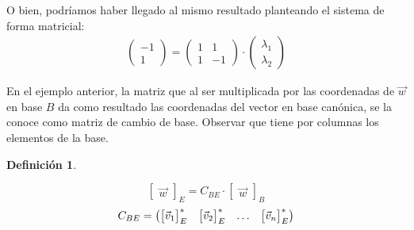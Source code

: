 \documentclass[a5paper,12pt,twoside]{book}
\newtheorem{defn}{{Definición}}[chapter]
\begin{document}
\begin{mdframed}[style=ExampleFrame]
    O bien, podríamos haber llegado al mismo resultado planteando el sistema de forma matricial:
    \begin{gather*}
        \begin{pmatrix}
            -1
            \\
            1
        \end{pmatrix}
        =
        \begin{pmatrix}
            1 & 1
            \\
            1 & -1
        \end{pmatrix}
        \cdot
        \begin{pmatrix}
            \lambda_1
            \\
            \lambda_2
        \end{pmatrix}
    \end{gather*}
\end{mdframed}

En el ejemplo anterior, la matriz que al ser multiplicada por las coordenadas de $\Vec{w}$ en base $B$ da como resultado las coordenadas del vector en base canónica, se la conoce como matriz de cambio de base.
Observar que tiene por columnas los elementos de la base.

\begin{mdframed}[style=DefinitionFrame]
    \begin{defn}
        \label{defn:C_BE}
    \end{defn}
    \begin{equation*}
        \begin{bmatrix}
            \Vec{w}
        \end{bmatrix}_E
        = C_{BE} \cdot
        \begin{bmatrix}
            \Vec{w}
        \end{bmatrix}_B
    \end{equation*}
    \begin{equation*}
        C_{BE} =
        \begin{pmatrix}
            { \begin{bmatrix} \Vec{v}_1 \end{bmatrix} }_E^* & { \begin{bmatrix} \Vec{v}_2 \end{bmatrix} }_E^* & \dots & { \begin{bmatrix} \Vec{v}_n \end{bmatrix} }_E^*
        \end{pmatrix}
    \end{equation*}
\end{mdframed}
\end{document}

